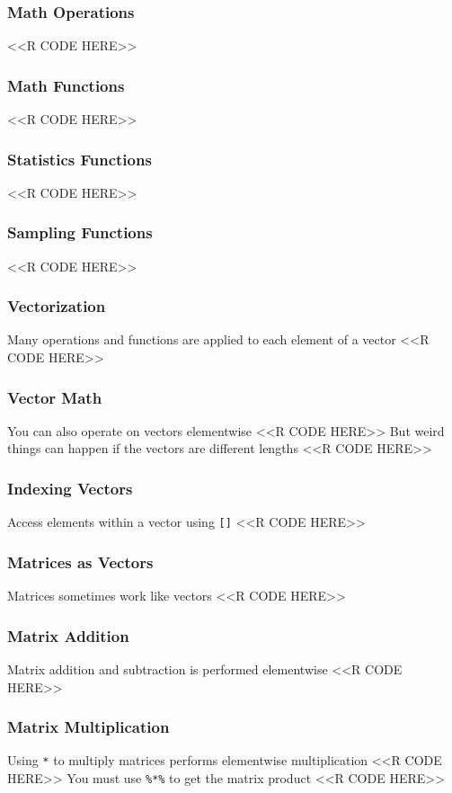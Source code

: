 \documentclass{beamer}
\begin{document}
\begin{frame}[fragile]\frametitle{Math Operations}
    <<R CODE HERE>>
\end{frame}

\begin{frame}[fragile]\frametitle{Math Functions}
    <<R CODE HERE>>
\end{frame}

\begin{frame}[fragile]\frametitle{Statistics Functions}
    <<R CODE HERE>>
\end{frame}

\begin{frame}[fragile]\frametitle{Sampling Functions}
    <<R CODE HERE>>
\end{frame}

\begin{frame}[fragile]\frametitle{Vectorization}
    Many operations and functions are applied to each element of a vector
    <<R CODE HERE>>
\end{frame}

\begin{frame}[fragile]\frametitle{Vector Math}
    You can also operate on vectors elementwise
    <<R CODE HERE>>
    \vspace{3ex}
    But weird things can happen if the vectors are different lengths
    <<R CODE HERE>>
\end{frame}

\begin{frame}[fragile]\frametitle{Indexing Vectors}
    Access elements within a vector using \texttt{[]}
    <<R CODE HERE>>
\end{frame}

\begin{frame}[fragile]\frametitle{Matrices as Vectors}
    Matrices sometimes work like vectors
    <<R CODE HERE>>
\end{frame}

\begin{frame}[fragile]\frametitle{Matrix Addition}
    Matrix addition and subtraction is performed elementwise
    <<R CODE HERE>>
\end{frame}

\begin{frame}[fragile]\frametitle{Matrix Multiplication}
    Using \texttt{*} to multiply matrices performs elementwise multiplication
    <<R CODE HERE>>
    \vspace{3}
    You must use \texttt{\%*\%} to get the matrix product
    <<R CODE HERE>>
\end{frame}
\end{document}
